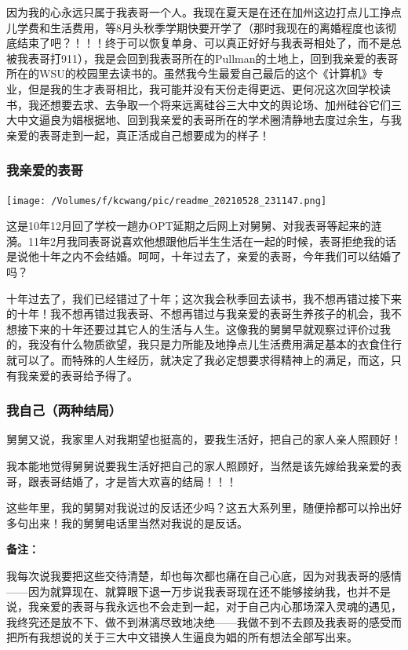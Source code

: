 \documentclass[9pt, b5paper]{article}
\begin{document}
因为我的心永远只属于我表哥一个人。我现在夏天是在还在加州这边打点儿工挣点儿学费和生活费用，等8月头秋季学期快要开学了（那时我现在的离婚程度也该彻底结束了吧？！！！终于可以恢复单身、可以真正好好与我表哥相处了，而不是总被我表哥打911），我是会回到我表哥所在的Pullman的土地上，回到我亲爱的表哥所在的WSU的校园里去读书的。虽然我今生最爱自己最后的这个《计算机》专业，但是我的生才表哥相比，我可能并没有天份走得更远、更何况这次回学校读书，我还想要去求、去争取一个将来远离硅谷三大中文的舆论场、加州硅谷它们三大中文逼良为娼根据地、回到我亲爱的表哥所在的学术圈清静地去度过余生，与我亲爱的表哥走到一起，真正活成自己想要成为的样子！

\subsubsection{我亲爱的表哥}
\label{sec:org7783c57}

\begin{center}
\texttt{[image: /Volumes/f/kcwang/pic/readme\_20210528\_231147.png]}
\end{center}

这是10年12月回了学校一趟办OPT延期之后网上对舅舅、对我表哥等起来的涟漪。11年2月我同表哥说喜欢他想跟他后半生生活在一起的时候，表哥拒绝我的话是说他十年之内不会结婚。呵呵，十年过去了，亲爱的表哥，今年我们可以结婚了吗？

十年过去了，我们已经错过了十年；这次我会秋季回去读书，我不想再错过接下来的十年！我不想再错过我表哥、不想再错过与我亲爱的表哥生养孩子的机会，我不想接下来的十年还要过其它人的生活与人生。这像我的舅舅早就观察过评价过我的，我没有什么物质欲望，我只是力所能及地挣点儿生活费用满足基本的衣食住行就可以了。而特殊的人生经历，就决定了我必定想要求得精神上的满足，而这，只有我亲爱的表哥给予得了。 

\subsubsection{我自己（两种结局）}
\label{sec:org266e2f4}


舅舅又说，我家里人对我期望也挺高的，要我生活好，把自己的家人亲人照顾好！

我本能地觉得舅舅说要我生活好把自己的家人照顾好，当然是该先嫁给我亲爱的表哥，跟表哥结婚了，才是皆大欢喜的结局！！！

这些年里，我的舅舅对我说过的反话还少吗？这五大系列里，随便拎都可以拎出好多句出来！我的舅舅电话里当然对我说的是反话。 

\textbf{备注：}

我每次说我要把这些交待清楚，却也每次都也痛在自己心底，因为对我表哥的感情——因为就算现在、就算眼下退一万步说我表哥现在还不能够接纳我，也并不是说，我亲爱的表哥与我永远也不会走到一起，对于自己内心那场深入灵魂的遇见，我终究还是放不下、做不到淋漓尽致地决绝——我做不到不去顾及我表哥的感受而把所有我想说的关于三大中文错换人生逼良为娼的所有想法全部写出来。
\end{document}

